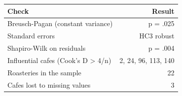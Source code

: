 \begin{tabular}{lr}
\toprule
Check & Result \\
\midrule
Breusch-Pagan (constant variance) & p = .025 \\
Standard errors & HC3 robust \\
Shapiro-Wilk on residuals & p = .004 \\
Influential cafes (Cook's D > 4/n) & 2, 24, 96, 113, 140 \\
Roasteries in the sample & 22 \\
Cafes lost to missing values & 3 \\
\bottomrule
\end{tabular}
